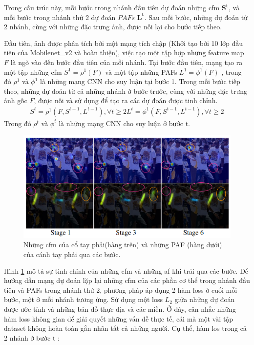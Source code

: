 Trong cấu trúc này, mỗi bước trong nhánh đầu tiên dự đoán những cfm $\mathbf{S^{t}}$, và mỗi bước trong nhánh thứ 2 dự đoán $PAFs$ $\mathbf{L^{t}}$. Sau mỗi bước, những dự đoán từ 2 nhánh, cùng với những đặc trưng ảnh, được nối lại cho bước tiếp theo.

Đầu tiên, ảnh được phân tích bởi một mạng tích chập (Khởi tạo bởi 10 lớp đầu tiên của Mobilenet\_v2 \cite{sandler2018mobilenetv2} và hoàn thiện), việc tạo một tập hợp những feature map $F$ là ngõ vào đến bước đầu tiên của mỗi nhánh. Tại bước đầu tiên, mạng tạo ra một tập những cfm $S^1 =  \rho ^{1}(F)$ và một tập những PAFs $L^1 =   \phi  ^{1}(F)$ , trong đó $\rho ^{1}$ và $\phi  ^{1}$ là những mạng CNN cho suy luận tại bước 1. Trong mỗi bước tiếp theo, những dự đoán từ cả những nhánh ở bước trước, cùng với những đặc trưng ảnh gốc $F$, được nối và sử dụng để tạo ra các dự đoán được tinh chỉnh.
\begin{align}
S^t =  \rho ^{1}(F, S^{t-1},L^{t-1}),  \forall t  \geq 2
L^t =  \phi ^{1}(F, S^{t-1},L^{t-1}),  \forall t  \geq 2
\end{align}
Trong đó $\rho^t$ và $\phi^t$ là những mạng CNN cho suy luận ở bước t.

\FloatBarrier
\begin{figure}[htp]
\begin{center}
\includegraphics[scale=0.6]{chap3/c3_figs/1.png}
\end{center}
\caption{Những cfm của cổ tay phải(hàng trên) và những PAF (hàng dưới) của cánh tay phải qua các bước.}
\label{fig:1}
\end{figure}
\FloatBarrier

Hình \ref{fig:1} mô tả sự tinh chỉnh của những cfm và những af khi trải qua các bước. Để hướng dẫn mạng dự đoán lặp lại những cfm của các phần cơ thể trong nhánh đầu tiên và PAFs trong nhánh thứ 2, phương pháp áp dụng 2 hàm loss ở cuối mỗi bước, một ở mỗi nhánh tương ứng. Sử dụng một loss $L_2$ giữa những dự đoán được ước tính và những bản đồ thực địa và các miền. Ở đây, cân nhắc những hàm loss không gian để giải quyết những vấn đề thực tế, cái mà một vài tập dataset không hoàn toàn gắn nhãn tất cả những người. Cụ thể, hàm los trong cả 2 nhánh ở bước t 
:

